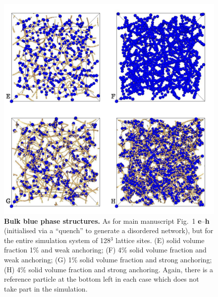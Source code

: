 \documentclass[12pt,twoside]{article}
\begin{document}
\begin{figure}[!h]
\begin{center}
\includegraphics[scale=0.35]{support-fig3.pdf}
\end{center}
\caption{\textbf{Bulk blue phase structures.}
As for main manuscript Fig.~1 \textbf{e}--\textbf{h}
(initialised via a ``quench''
to generate a disordered network), but for the entire simulation
system of 128$^3$ lattice sites. (E) solid volume fraction 1\% and
weak anchoring; (F) 4\% solid volume fraction and weak anchoring;
(G) 1\% solid volume fraction and strong anchoring; (H) 4\% solid
volume fraction and strong anchoring. Again, there is a reference
particle at the bottom left in each case which does not take part
in the simulation.}
\end{figure}

\newpage
\end{document}

